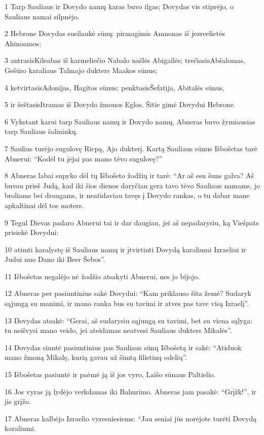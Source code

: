 \par 1 Tarp Sauliaus ir Dovydo namų karas buvo ilgas; Dovydas vis stiprėjo, o Sauliaus namai silpnėjo. 
\par 2 Hebrone Dovydas susilaukė sūnų: pirmagimis Amnonas iš jezreelietės Ahinoamos; 
\par 3 antrasis­Kileabas iš karmeliečio Nabalo našlės Abigailės; trečiasis­Abšalomas, Gešūro karaliaus Talmajo dukters Maakos sūnus; 
\par 4 ketvirtasis­Adonijas, Hagitos sūnus; penktasis­Šefatija, Abitalės sūnus, 
\par 5 ir šeštasis­Itramas iš Dovydo žmonos Eglos. Šitie gimė Dovydui Hebrone. 
\par 6 Vykstant karui tarp Sauliaus namų ir Dovydo namų, Abneras buvo žymiausias tarp Sauliaus šalininkų. 
\par 7 Saulius turėjo sugulovę Ricpą, Ajo dukterį. Kartą Sauliaus sūnus Išbošetas tarė Abnerui: “Kodėl tu įėjai pas mano tėvo sugulovę?” 
\par 8 Abneras labai supyko dėl tų Išbošeto žodžių ir tarė: “Ar aš esu šuns galva? Aš buvau prieš Judą, kad iki šios dienos daryčiau gera tavo tėvo Sauliaus namams, jo broliams bei draugams, ir neatidaviau tavęs į Dovydo rankas, o tu dabar mane apkaltinai dėl tos moters. 
\par 9 Tegul Dievas padaro Abnerui tai ir dar daugiau, jei aš nepadarysiu, ką Viešpats prisiekė Dovydui: 
\par 10 atimti karalystę iš Sauliaus namų ir įtvirtinti Dovydą karaliumi Izraeliui ir Judui nuo Dano iki Beer Šebos”. 
\par 11 Išbošetas negalėjo nė žodžio atsakyti Abnerui, nes jo bijojo. 
\par 12 Abneras per pasiuntinius sakė Dovydui: “Kam priklauso šita žemė? Sudaryk sąjungą su manimi, ir mano ranka bus su tavimi ir atves pas tave visą Izraelį”. 
\par 13 Dovydas atsakė: “Gerai, aš sudarysiu sąjungą su tavimi, bet su viena sąlyga: tu neišvysi mano veido, jei ateidamas neatvesi Sauliaus dukters Mikalės”. 
\par 14 Dovydas siuntė pasiuntinius pas Sauliaus sūnų Išbošetą ir sakė: “Atiduok mano žmoną Mikalę, kurią gavau už šimtą filistinų odelių”. 
\par 15 Išbošetas pasiuntė ir paėmė ją iš jos vyro, Laišo sūnaus Paltielio. 
\par 16 Jos vyras ją lydėjo verkdamas iki Bahurimo. Abneras jam pasakė: “Grįžk!”, ir jis grįžo. 
\par 17 Abneras kalbėjo Izraelio vyresniesiems: “Jau seniai jūs norėjote turėti Dovydą karaliumi. 
